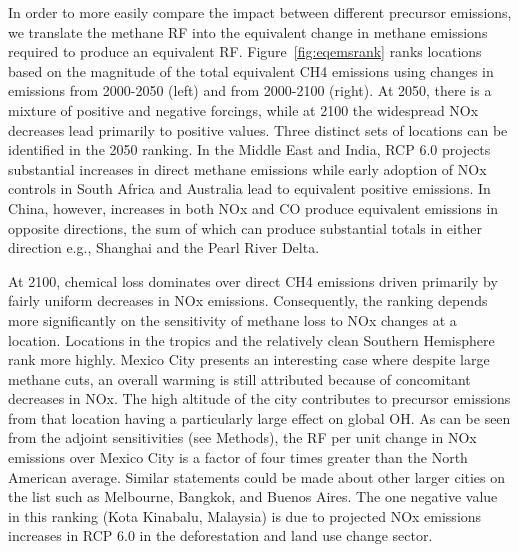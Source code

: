 In order to more easily compare the impact between different precursor emissions, we translate the methane RF into the equivalent change in methane emissions required to produce an equivalent RF. Figure~\ref{fig:eqemsrank} ranks locations based on the magnitude of the total equivalent CH4 emissions using changes in emissions from 2000-2050 (left) and from 2000-2100 (right). At 2050, there is a mixture of positive and negative forcings, while at 2100 the widespread NOx decreases lead primarily to positive values. Three distinct sets of locations can be identified in the 2050 ranking. In the Middle East and India, RCP 6.0 projects substantial increases in direct methane emissions  while early adoption of NOx controls in South Africa and Australia lead to equivalent positive emissions. In China, however, increases in both NOx and CO produce  equivalent emissions in opposite directions, the sum of which can produce substantial totals in either direction e.g., Shanghai and the Pearl River Delta.

At 2100, chemical loss dominates over direct CH4 emissions driven primarily by  fairly uniform decreases in NOx emissions.  Consequently, the ranking depends more significantly on  the sensitivity of methane loss to NOx changes at a location. Locations in the tropics and the relatively clean Southern Hemisphere rank more highly. Mexico City presents an interesting case where despite large methane cuts, an overall warming is still attributed because of concomitant decreases in NOx. The high altitude of the city contributes to precursor emissions from that location having a particularly large effect on global OH. As can be seen from the adjoint sensitivities (see Methods), the RF per unit change in NOx emissions over Mexico City is a factor of four times greater than the North American average. Similar statements could be made about other larger cities on the list such as Melbourne, Bangkok, and Buenos Aires. The one negative value in this ranking (Kota Kinabalu, Malaysia) is due to projected NOx emissions increases in RCP 6.0 in the deforestation and land use change sector.